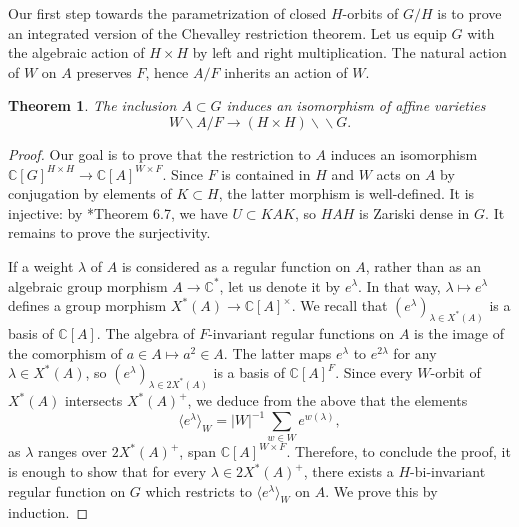 \documentclass{amsart}
\newtheorem{theorem}{Theorem}
\theoremstyle{definition}
\newcommand{\dquo}{\backslash \!\! \backslash}
\begin{document}
Our first step towards the parametrization of closed $H$-orbits of $G/H$ is to prove an integrated version of the Chevalley restriction theorem. Let us equip $G$ with the algebraic action of $H \times H$ by left and right multiplication. The natural action of $W$ on $A$ preserves $F$, hence $A/F$ inherits an action of $W$.

\begin{theorem} \label{restriction}
    The inclusion $A \subset G$ induces an isomorphism of affine varieties $$W \backslash A /F \to (H \times H) \dquo G.$$
\end{theorem}

\begin{proof}
    Our goal is to prove that the restriction to $A$ induces an isomorphism $\mathbb{C}[G]^{H\times H} \to \mathbb{C}[A]^{W\times F}$.
    Since $F$ is contained in $H$ and $W$ acts on $A$ by conjugation by elements of $K \subset H$, the latter morphism is well-defined. It is injective: by \cite{Helgason1}*{Theorem 6.7}, we have $U \subset KAK$, so $HAH$ is Zariski dense in $G$. It remains to prove the surjectivity.
    
    If a weight $\lambda$ of $A$ is considered as a regular function on $A$, rather than as an algebraic group morphism $A \to \mathbb{C}^*$, let us denote it by $e^\lambda$. In that way, $\lambda \mapsto e^\lambda$ defines a group morphism $X^*(A) \to \mathbb{C}[A]^\times$. We recall that $(e^\lambda)_{\lambda \in X^*(A)}$ is a basis of $\mathbb{C}[A]$. The algebra of $F$-invariant regular functions on $A$ is the image of the comorphism of $a \in A \mapsto a^2 \in A$. The latter maps $e^\lambda$ to $e^{2\lambda}$ for any $\lambda \in X^*(A)$, so $(e^\lambda)_{\lambda \in 2X^*(A)}$ is a basis of $\mathbb{C}[A]^F$.
    Since every $W$-orbit of $X^*(A)$ intersects $X^*(A)^+$, we deduce from the above that the elements $$\langle e^\lambda \rangle_W =|W|^{-1} \sum_{w \in W} e^{w(\lambda)},$$ as $\lambda$ ranges over $2X^*(A)^+$, span $\mathbb{C}[A]^{W\times F}$. Therefore, to conclude the proof, it is enough to show that for every $\lambda \in 2X^*(A)^+$, there exists a $H$-bi-invariant regular function on $G$ which restricts to $\langle e^\lambda \rangle_W$ on $A$. We prove this by induction.
    

\end{proof}
\end{document}
